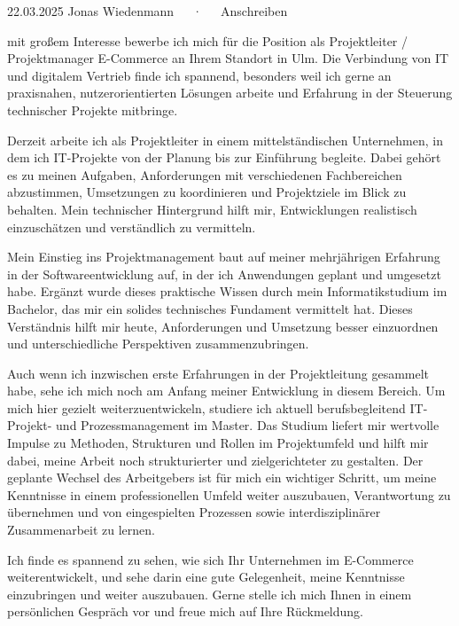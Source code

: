 \documentclass[11pt, a4paper]{awesome-cv}
\begin{document}
\makecvheader[R]

\makecvfooter
  {22.03.2025}
  {Jonas Wiedenmann~~~·~~~Anschreiben}
  {}

\makelettertitle

\begin{cvletter}

  mit großem Interesse bewerbe ich mich für die Position als Projektleiter / Projektmanager E-Commerce an Ihrem Standort in Ulm. Die Verbindung von IT und digitalem Vertrieb finde ich spannend, besonders weil ich gerne an praxisnahen, nutzerorientierten Lösungen arbeite und Erfahrung in der Steuerung technischer Projekte mitbringe.

  Derzeit arbeite ich als Projektleiter in einem mittelständischen Unternehmen, in dem ich IT-Projekte von der Planung bis zur Einführung begleite. Dabei gehört es zu meinen Aufgaben, Anforderungen mit verschiedenen Fachbereichen abzustimmen, Umsetzungen zu koordinieren und Projektziele im Blick zu behalten. Mein technischer Hintergrund hilft mir, Entwicklungen realistisch einzuschätzen und verständlich zu vermitteln.
  
  Mein Einstieg ins Projektmanagement baut auf meiner mehrjährigen Erfahrung in der Softwareentwicklung auf, in der ich Anwendungen geplant und umgesetzt habe. Ergänzt wurde dieses praktische Wissen durch mein Informatikstudium im Bachelor, das mir ein solides technisches Fundament vermittelt hat. Dieses Verständnis hilft mir heute, Anforderungen und Umsetzung besser einzuordnen und unterschiedliche Perspektiven zusammenzubringen.
  
  Auch wenn ich inzwischen erste Erfahrungen in der Projektleitung gesammelt habe, sehe ich mich noch am Anfang meiner Entwicklung in diesem Bereich. Um mich hier gezielt weiterzuentwickeln, studiere ich aktuell berufsbegleitend IT-Projekt- und Prozessmanagement im Master. Das Studium liefert mir wertvolle Impulse zu Methoden, Strukturen und Rollen im Projektumfeld und hilft mir dabei, meine Arbeit noch strukturierter und zielgerichteter zu gestalten. Der geplante Wechsel des Arbeitgebers ist für mich ein wichtiger Schritt, um meine Kenntnisse in einem professionellen Umfeld weiter auszubauen, Verantwortung zu übernehmen und von eingespielten Prozessen sowie interdisziplinärer Zusammenarbeit zu lernen.
  
  Ich finde es spannend zu sehen, wie sich Ihr Unternehmen im E-Commerce weiterentwickelt, und sehe darin eine gute Gelegenheit, meine Kenntnisse einzubringen und weiter auszubauen. Gerne stelle ich mich Ihnen in einem persönlichen Gespräch vor und freue mich auf Ihre Rückmeldung.

\end{cvletter}


\makeletterclosing
\end{document}
